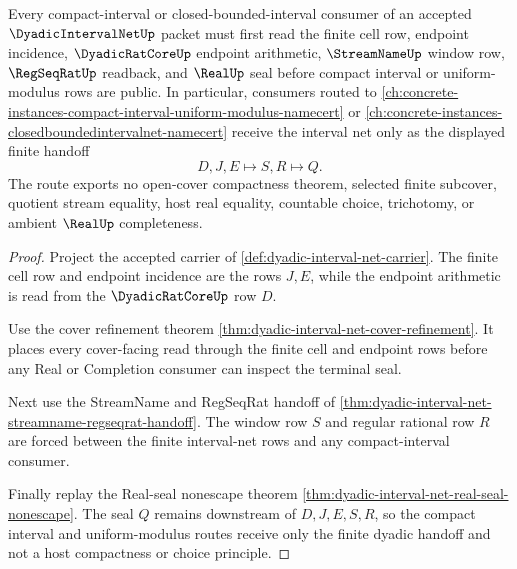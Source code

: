 \begin{theorem}
\label{thm:dyadic-interval-net-compact-interval-forward-route}
Every compact-interval or closed-bounded-interval consumer of an accepted $\DyadicIntervalNetUp$ packet must first read the finite cell row, endpoint incidence, $\DyadicRatCoreUp$ endpoint arithmetic, $\StreamNameUp$ window row, $\RegSeqRatUp$ readback, and $\RealUp$ seal before compact interval or uniform-modulus rows are public. In particular, consumers routed to \autoref{ch:concrete-instances-compact-interval-uniform-modulus-namecert} or \autoref{ch:concrete-instances-closedboundedintervalnet-namecert} receive the interval net only as the displayed finite handoff
$$
D,J,E \longmapsto S,R \longmapsto Q .
$$
The route exports no open-cover compactness theorem, selected finite subcover, quotient stream equality, host real equality, countable choice, trichotomy, or ambient $\RealUp$ completeness.
\end{theorem}
\begin{proof}
Project the accepted carrier of \autoref{def:dyadic-interval-net-carrier}. The finite cell row and endpoint incidence are the rows $J,E$, while the endpoint arithmetic is read from the $\DyadicRatCoreUp$ row $D$.

Use the cover refinement theorem \autoref{thm:dyadic-interval-net-cover-refinement}. It places every cover-facing read through the finite cell and endpoint rows before any Real or Completion consumer can inspect the terminal seal.

Next use the StreamName and RegSeqRat handoff of \autoref{thm:dyadic-interval-net-streamname-regseqrat-handoff}. The window row $S$ and regular rational row $R$ are forced between the finite interval-net rows and any compact-interval consumer.

Finally replay the Real-seal nonescape theorem \autoref{thm:dyadic-interval-net-real-seal-nonescape}. The seal $Q$ remains downstream of $D,J,E,S,R$, so the compact interval and uniform-modulus routes receive only the finite dyadic handoff and not a host compactness or choice principle.
\end{proof}
